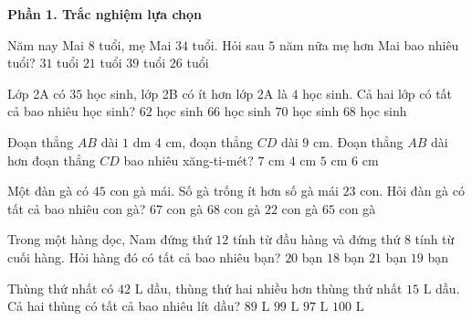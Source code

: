 \textbf{Phần 1. Trắc nghiệm lựa chọn}

\begin{ex} %
Năm nay Mai $8$ tuổi, mẹ Mai $34$ tuổi. Hỏi sau $5$ năm nữa mẹ hơn Mai bao nhiêu tuổi?
\choice
{$31$ tuổi}
{$21$ tuổi}
{$39$ tuổi}
{\True $26$ tuổi}
\end{ex}

\begin{ex} %
Lớp 2A có $35$ học sinh, lớp 2B có ít hơn lớp 2A là $4$ học sinh. Cả hai lớp có tất cả bao nhiêu học sinh?
\choice
{$62$ học sinh}
{\True $66$ học sinh}
{$70$ học sinh}
{$68$ học sinh}
\end{ex}

\begin{ex} %
Đoạn thẳng $AB$ dài $1\text{ dm } 4\text{ cm}$, đoạn thẳng $CD$ dài $9\text{ cm}$. Đoạn thẳng $AB$ dài hơn đoạn thẳng $CD$ bao nhiêu xăng-ti-mét?
\choice
{$7\text{ cm}$}
{$4\text{ cm}$}
{\True $5\text{ cm}$}
{$6\text{ cm}$}
\end{ex}

\begin{ex} %
Một đàn gà có $45$ con gà mái. Số gà trống ít hơn số gà mái $23$ con. Hỏi đàn gà có tất cả bao nhiêu con gà?
\choice
{\True $67$ con gà}
{$68$ con gà}
{$22$ con gà}
{$65$ con gà}
\end{ex}

\begin{ex} %
Trong một hàng dọc, Nam đứng thứ $12$ tính từ đầu hàng và đứng thứ $8$ tính từ cuối hàng. Hỏi hàng đó có tất cả bao nhiêu bạn?
\choice
{$20$ bạn}
{$18$ bạn}
{$21$ bạn}
{\True $19$ bạn}
\end{ex}

\begin{ex} %
Thùng thứ nhất có $42\text{ L}$ dầu, thùng thứ hai nhiều hơn thùng thứ nhất $15\text{ L}$ dầu. Cả hai thùng có tất cả bao nhiêu lít dầu?
\choice
{$89\text{ L}$}
{\True $99\text{ L}$}
{$97\text{ L}$}
{$100\text{ L}$}
\end{ex}

